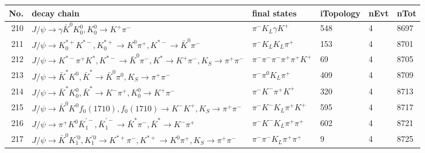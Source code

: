 \begin{table}[htbp] 
\begin{center}
\begin{small}
\begin{tabular}{rlllll}\hline\hline
 No. & decay chain & final states &  iTopology & nEvt & nTot \\\hline
210&$J/\psi       \rightarrow \gamma       \bar{K}^{0}   K_0^{0}        , K_0^{0}         \rightarrow K^{+}          \pi^{-}        $&$\pi^{-}        K_{L}          \gamma       K^{+}          $&  548&    4& 8697\\
211&$J/\psi       \rightarrow K_{0}^{*+}     K^{*-}         , K_{0}^{*+}      \rightarrow K^{0}          \pi^{+}        , K^{*-}          \rightarrow \bar{K}^{0}   \pi^{-}        $&$\pi^{-}        K_{L}          K_{L}          \pi^{+}        $&  153&    4& 8701\\
212&$J/\psi       \rightarrow K^{*-}         \pi^{+}        K^{*}          , K^{*-}          \rightarrow \bar{K}^{0}   \pi^{-}        , K^{*}           \rightarrow K^{+}          \pi^{-}        , K_{S}           \rightarrow \pi^{+}        \pi^{-}        $&$\pi^{-}        \pi^{-}        \pi^{-}        \pi^{+}        \pi^{+}        K^{+}          $&   69&    4& 8705\\
213&$J/\psi       \rightarrow \bar{K}^{*}   K^{0}          , \bar{K}^{*}    \rightarrow \bar{K}^{0}   \pi^{0}        , K_{S}           \rightarrow \pi^{+}        \pi^{-}        $&$\pi^{-}        \pi^{0}        K_{L}          \pi^{+}        $&  409&    4& 8709\\
214&$J/\psi       \rightarrow \bar{K}^{*}   K_0^{0}        , \bar{K}^{*}    \rightarrow K^{-}          \pi^{+}        , K_0^{0}         \rightarrow K^{+}          \pi^{-}        $&$\pi^{-}        K^{-}          \pi^{+}        K^{+}          $&  320&    4& 8713\\
215&$J/\psi       \rightarrow \bar{K}^{0}   K^{0}          f_{0}(1710)    , f_{0}(1710)     \rightarrow K^{-}          K^{+}          , K_{S}           \rightarrow \pi^{+}        \pi^{-}        $&$\pi^{-}        K^{-}          K_{L}          \pi^{+}        K^{+}          $&  595&    4& 8717\\
216&$J/\psi       \rightarrow \pi^{+}        K^{0}          \bar{K}_1^{'-}, \bar{K}_1^{'-} \rightarrow \bar{K}^{*}   \pi^{-}        , \bar{K}^{*}    \rightarrow K^{-}          \pi^{+}        $&$\pi^{-}        K^{-}          K_{L}          \pi^{+}        \pi^{+}        $&  602&    4& 8721\\
217&$J/\psi       \rightarrow \bar{K}^{0}   K_1^{'0}      , K_1^{'0}       \rightarrow K^{*+}         \pi^{-}        , K^{*+}          \rightarrow K^{0}          \pi^{+}        , K_{S}           \rightarrow \pi^{+}        \pi^{-}        $&$\pi^{-}        \pi^{-}        K_{L}          \pi^{+}        \pi^{+}        $&    9&    4& 8725\\

\end{tabular}
\end{small}
\end{center}
\end{table}
